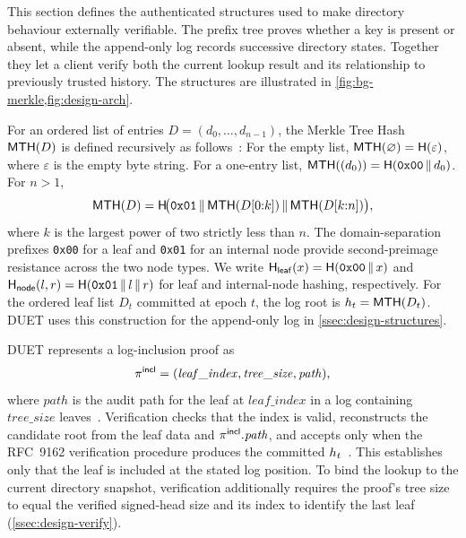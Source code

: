 This section defines the authenticated structures used to make directory behaviour externally
verifiable. The prefix tree proves whether a key is present or absent, while the append-only log
records successive directory states. Together they let a client verify both the current lookup result
and its relationship to previously trusted history. The structures are illustrated in
\cref{fig:bg-merkle,fig:design-arch}.

\begin{definition}\label{def:merkle-log}
For an ordered list of entries $D=(d_0,\dots,d_{n-1})$, the Merkle Tree Hash $\mathsf{MTH}(D)$ is defined
recursively as follows~\cite[Section~2.1.1]{rfc9162}:
For the empty list, $\mathsf{MTH}(\varnothing)=\mathsf{H}(\varepsilon)$, where $\varepsilon$ is the empty byte
string. For a one-entry list, $\mathsf{MTH}((d_0))=\mathsf{H}(\texttt{0x00}\,\|\, d_0)$. For $n>1$,
\[
  \mathsf{MTH}(D)=\mathsf{H}\!\big(\texttt{0x01}\,\|\, \mathsf{MTH}(D[0{:}k])
  \,\|\, \mathsf{MTH}(D[k{:}n])\big),
\]
where $k$ is the largest power of two strictly less than $n$. The domain-separation prefixes
\texttt{0x00} for a leaf and \texttt{0x01} for an internal node provide second-preimage resistance
across the two node types. We write $\mathsf{H}_{\mathsf{leaf}}(x)=\mathsf{H}(\texttt{0x00}\,\|\, x)$ and
$\mathsf{H}_{\mathsf{node}}(l,r)=\mathsf{H}(\texttt{0x01}\,\|\, l\,\|\, r)$ for leaf and internal-node hashing,
respectively. For the ordered leaf list $D_t$ committed at epoch $t$, the log root is
$h_{t}=\mathsf{MTH}(D_t)$. DUET uses this construction for the append-only log in
\cref{ssec:design-structures}.
\end{definition}

\begin{definition}\label{def:inclusion}
DUET represents a log-inclusion proof as
\[
\pi^{\mathsf{incl}}=(\mathit{leaf\_index},\mathit{tree\_size},\mathit{path}),
\]
where $\mathit{path}$ is the audit path for the leaf at $\mathit{leaf\_index}$ in a log containing
$\mathit{tree\_size}$ leaves~\cite[Section~2.1.3.1]{rfc9162}. Verification checks that the index is
valid, reconstructs the candidate root from the leaf data and $\pi^{\mathsf{incl}}.\mathit{path}$, and accepts
only when the RFC~9162 verification procedure produces the committed
$h_{t}$~\cite[Section~2.1.3.2]{rfc9162}. This establishes only that the leaf is included at
the stated log position. To bind the lookup to the current directory snapshot, verification
additionally requires the proof's tree size to equal the verified signed-head size and its index to
identify the last leaf (\cref{ssec:design-verify}).
\end{definition}


